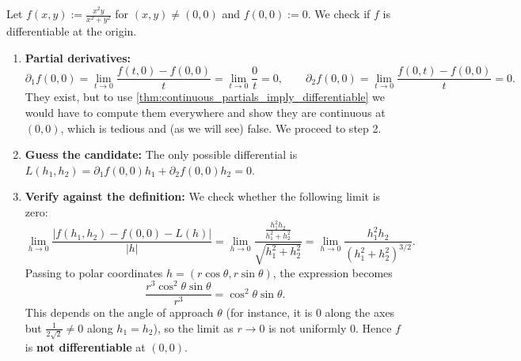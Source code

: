 \begin{example}
\label{ex:differentiability_recipe_application}
Let $f(x,y) := \frac{x^2 y}{x^2+y^2}$ for $(x,y) \neq (0,0)$ and $f(0,0) := 0$. We check if $f$ is differentiable at the origin.
\begin{enumerate}[label=\textbf{(\alph*)}]
  \item \textbf{Partial derivatives:}
    \[\partial_1 f(0,0) = \lim_{t\to 0}\frac{f(t,0)-f(0,0)}{t} = \lim_{t\to 0}\frac{0}{t} = 0, \qquad \partial_2 f(0,0) = \lim_{t\to 0}\frac{f(0,t)-f(0,0)}{t} = 0.\]
    They exist, but to use \cref{thm:continuous_partials_imply_differentiable} we would have to compute them everywhere and show they are continuous at $(0,0)$, which is tedious and (as we will see) false. We proceed to step 2.
  \item \textbf{Guess the candidate:} The only possible differential is $L(h_1,h_2) = \partial_1 f(0,0)h_1 + \partial_2 f(0,0)h_2 = 0$.
  \item \textbf{Verify against the definition:} We check whether the following limit is zero:
    \[\lim_{h\to 0} \frac{|f(h_1,h_2) - f(0,0) - L(h)|}{|h|} = \lim_{h\to 0} \frac{\frac{h_1^2 h_2}{h_1^2+h_2^2}}{\sqrt{h_1^2+h_2^2}} = \lim_{h\to 0} \frac{h_1^2 h_2}{(h_1^2+h_2^2)^{3/2}}.\]
    Passing to polar coordinates $h = (r\cos\theta, r\sin\theta)$, the expression becomes
    \[\frac{r^3\cos^2\theta\sin\theta}{r^3} = \cos^2\theta\sin\theta.\]
    This depends on the angle of approach $\theta$ (for instance, it is $0$ along the axes but $\frac{1}{2\sqrt{2}} \neq 0$ along $h_1=h_2$), so the limit as $r \to 0$ is not uniformly $0$. Hence $f$ is \textbf{not differentiable} at $(0,0)$.
\end{enumerate}
\end{example}

